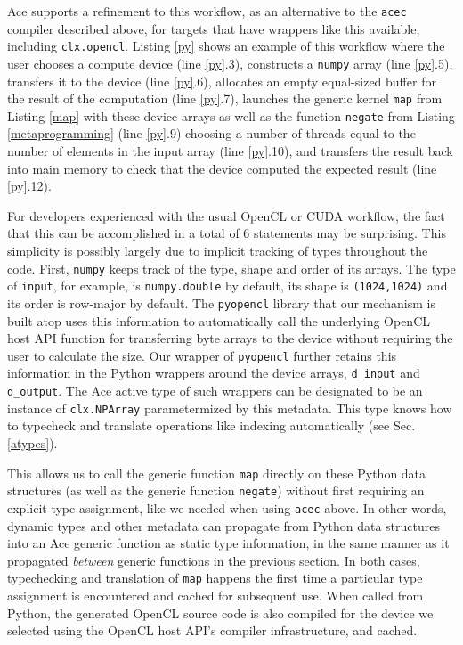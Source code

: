 \documentclass[9pt,preprint]{sigplanconf}
\begin{document}
Ace supports a refinement to this workflow, as an alternative to the \verb|acec| compiler described above, for targets that have wrappers like this available, including \verb|clx.opencl|. Listing \ref{py} shows an example of this workflow where the user chooses a compute device (line \ref{py}.3),  constructs a \verb|numpy| array (line \ref{py}.5), transfers it to the device (line \ref{py}.6), allocates an empty equal-sized buffer for the result of the computation (line \ref{py}.7), launches the {generic} kernel \verb|map| from Listing \ref{map} with these device arrays as well as the function \verb|negate| from Listing \ref{metaprogramming} (line \ref{py}.9) choosing a number of threads equal to the number of elements in the input array (line \ref{py}.10), and transfers the result back into main memory to check that the device computed the expected result (line \ref{py}.12).

For developers experienced with the usual OpenCL or CUDA workflow, the fact that this can be accomplished in a total of 6 statements may be surprising. This simplicity is possibly largely due to  implicit tracking of types throughout the code. First, \verb|numpy| keeps track of the type, shape and order of its arrays. The type of \verb|input|, for example, is \verb|numpy.double| by default, its shape is \verb|(1024,1024)| and its order is row-major by default. The \verb|pyopencl| library that our mechanism is built atop uses this information to automatically call the underlying OpenCL host API function for transferring byte arrays to the device without requiring the user to calculate the size. Our wrapper of \verb|pyopencl| further retains this information in the Python wrappers around the device arrays, \verb|d_input| and \verb|d_output|. The Ace active type of such wrappers can be designated to be an instance of \verb|clx.NPArray| parametermized by this metadata. This type knows how to typecheck and translate operations like indexing automatically (see Sec. \ref{atypes}).

This allows us to call the generic function \verb|map| directly on these Python data structures (as well as the generic function \verb|negate|) without first requiring an explicit type assignment, like we needed when using \verb|acec| above. In other words, dynamic types and other metadata can propagate from Python data structures into an Ace generic function as static type information, in the same manner as it propagated \emph{between} generic functions in the previous section. In both cases, typechecking and translation of \verb|map| happens the first time a particular type assignment is encountered and cached for subsequent use. When called from Python, the generated OpenCL source code is also compiled for the device we selected using the OpenCL host API's compiler infrastructure, and cached. 
\end{document}
